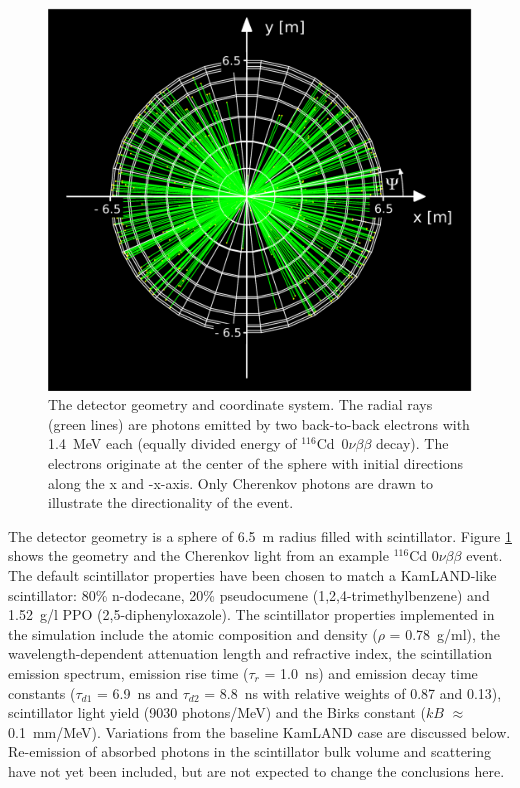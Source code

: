\documentclass[cits]{JINST}
\begin{document}
\begin{figure}
        \begin{center}
        \includegraphics[scale=0.4]{graphs/geometry_plot_labels.pdf}
        \caption[]{The detector geometry and coordinate system.
        The radial rays (green lines) are photons emitted by two back-to-back electrons with 1.4~MeV each
        (equally divided energy of $^{116}$Cd~$0\nu\beta\beta$ decay). The electrons originate at
        the center of the sphere with initial directions along the x
        and -x-axis. Only Cherenkov photons are drawn to illustrate the
        directionality of the event. \label{detector_view}}
        \end{center}
\end{figure}

The detector geometry is a sphere of 6.5~m radius filled with
scintillator. Figure \ref{detector_view} shows the geometry and the
Cherenkov light from an example $^{116}$Cd $0\nu\beta\beta$ event. The
default scintillator properties have been chosen to match a KamLAND-like
scintillator\cite{kamland2003}: 80\% n-dodecane, 20\% pseudocumene
(1,2,4-trimethylbenzene) and 1.52~g/l PPO (2,5-diphenyloxazole). The
scintillator properties implemented in the simulation include the
atomic composition and density ($\rho$ = 0.78~g/ml), the
wavelength-dependent attenuation length\cite{tajimaMaster} and
refractive index\cite{OlegThesis}, the scintillation emission
spectrum\cite{tajimaMaster}, emission rise time ($\tau_r$ = 1.0~ns)
and emission decay time constants ($\tau_{d1}$ = 6.9~ns and
$\tau_{d2}$ = 8.8~ns with relative weights of 0.87 and 
0.13)\cite{tajimaThesis}, scintillator light yield (9030 photons/MeV)
and the Birks constant ($kB$ $\approx$ 0.1~mm/MeV)\cite{ChrisThesis}. 
Variations from the baseline KamLAND case are
discussed below. Re-emission of absorbed photons in the scintillator
bulk volume and scattering have not yet been included, but are not
expected to change the conclusions here.
\end{document}
